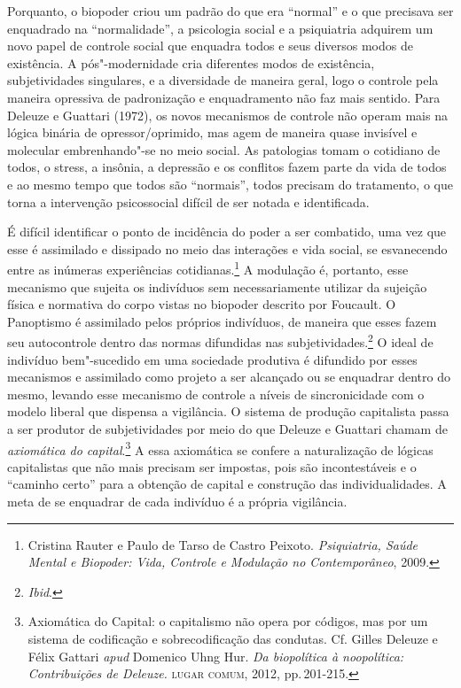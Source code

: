 Porquanto, o biopoder criou um padrão do que era ``normal'' e o que
precisava ser enquadrado na ``normalidade'', a psicologia social e a
psiquiatria adquirem um novo papel de controle social que enquadra todos
e seus diversos modos de existência. A pós"-modernidade cria diferentes
modos de existência, subjetividades singulares, e a diversidade de
maneira geral, logo o controle pela maneira opressiva de padronização e
enquadramento não faz mais sentido. Para Deleuze e Guattari (1972), os
novos mecanismos de controle não operam mais na lógica binária de
opressor/oprimido, mas agem de maneira quase invisível e molecular
embrenhando"-se no meio social. As patologias tomam o cotidiano de todos,
o stress, a insônia, a depressão e os conflitos fazem parte da vida de
todos e ao mesmo tempo que todos são ``normais'', todos precisam do
tratamento, o que torna a intervenção psicossocial difícil de ser notada
e identificada.

É difícil identificar o ponto de incidência do poder a ser combatido,
uma vez que esse é assimilado e dissipado no meio das interações e vida
social, se esvanecendo entre as inúmeras experiências cotidianas.\footnote{Cristina Rauter e Paulo de Tarso de Castro Peixoto. \emph{Psiquiatria, Saúde Mental e Biopoder: Vida, Controle e Modulação no Contemporâneo}, 2009.} A modulação é, portanto, esse mecanismo que
sujeita os indivíduos sem necessariamente utilizar da sujeição física e
normativa do corpo vistas no biopoder descrito por Foucault. O
Panoptismo é assimilado pelos próprios indivíduos, de maneira que esses
fazem seu autocontrole dentro das normas difundidas nas subjetividades.\footnote{\textit{Ibid}.}
O ideal de indivíduo bem"-sucedido em
uma sociedade produtiva é difundido por esses mecanismos e assimilado
como projeto a ser alcançado ou se enquadrar dentro do mesmo, levando
esse mecanismo de controle a níveis de sincronicidade com o modelo
liberal que dispensa a vigilância. O sistema de produção capitalista
passa a ser produtor de subjetividades por meio do que Deleuze e
Guattari chamam de \emph{axiomática do capital}.\footnote{Axiomática do
  Capital: o capitalismo não opera por códigos, mas por um sistema de
  codificação e sobrecodificação das condutas. Cf. Gilles Deleuze e Félix Gattari
\emph{apud} Domenico Uhng Hur. \emph{Da biopolítica à noopolítica: Contribuições de Deleuze.} \textsc{lugar comum}, 2012, pp.\,201-215.} A essa axiomática se confere a
naturalização de lógicas capitalistas que não mais precisam ser
impostas, pois são incontestáveis e o ``caminho certo'' para a obtenção
de capital e construção das individualidades. A meta de se enquadrar de
cada indivíduo é a própria vigilância.

